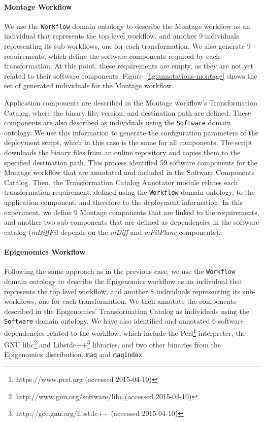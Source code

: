 \paragraph{\textbf{Montage Workflow}}
We use the \texttt{Workflow} domain ontology to describe the Montage workflow 
as an individual that represents the top level workflow, and another 9 individuals 
representing its sub-workflows, one for each transformation. We also generate 9 
requirements, which define the software components required by each transformation. 
At this point, these requirements are empty, as they are not yet related to their 
software components. Figure~\ref{fig:annotations-montage} shows the set of 
generated individuals for the Montage workflow.

Application components are described in the Montage workflow's Transformation 
Catalog, where the binary file, version, and destination path are defined. These 
components are also described as individuals using the \texttt{Software} domain 
ontology. We use this information to generate the configuration parameters of the 
deployment script, which in this case is the same for all components. The script 
downloads the binary files from an online repository and copies them to the specified 
destination path. This process identified 59 software components for the Montage 
workflow that are annotated and included in the Software Components Catalog.
Then, the Transformation Catalog Annotator module relates each transformation 
requirement, defined using the \texttt{Workflow} domain ontology, to the application 
component, and therefore to the deployment information. In this experiment, we 
define 9 Montage components that are linked to the requirements, and another two 
sub-components that are defined as dependencies in the software catalog 
(\emph{mDiffFit} depends on the \emph{mDiff} and \emph{mFitPlane} components).


\paragraph{\textbf{Epigenomics Workflow}}
Following the same approach as in the previous case, we use the \texttt{Workflow} 
domain ontology to describe the Epigenomics workflow as an individual that represents 
the top level workflow, and another 8 individuals representing its sub-workflows, one 
for each transformation. We then annotate 
the components described in the Epigenomics' Transformation Catalog as individuals 
using the \texttt{Software} domain ontology. We have also identified and annotated 6 
software dependencies related to the workflow, which include the Perl\footnote{https://www.perl.org (accessed 2015-04-10)} interpreter, 
the GNU libc\footnote{http://www.gnu.org/software/libc,(accessed 2015-04-10)} and Libstdc++\footnote{http://gcc.gnu.org/libstdc++ (accessed 2015-04-10)} libraries, and two other binaries from 
the Epigenomics  distribution, \texttt{maq} and \texttt{maqindex}.

